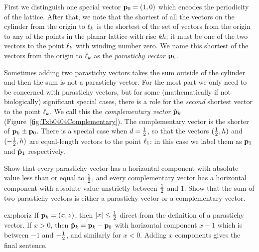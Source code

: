 First we distinguish one special vector ${\mathbf p}_{0}=(1,0)$ which encodes the periodicity of the lattice. After that, we note that the shortest of all the vectors on the cylinder from the origin to $\ell_{{k}}$ is the shortest of the set of vectors from the origin to any of the points in the planar lattice with rise $kh$; it must be one of the two vectors to the point $\ell_{{k}}$ with winding number zero. 
We name this shortest of the vectors from the origin to $\ell_{{k}}$ as  the \textit{parastichy vector} ${\mathbf p}_{k}$.

Sometimes adding two parastichy vectors takes the sum outside of the cylinder and then the sum is not a parastichy vector. For the most part we only need to be concerned with parastichy vectors, but for some (mathematically if not biologically)  significant special cases,  there is a role for the \textit{second} shortest vector to the point $\ell_{{k}}$. We call this the \emph{complementary vector} $\hat{\mathbf p}_{k}$ (Figure~\ref{fig:Txb0404Complementary}). The complementary vector is the shorter of ${\mathbf p}_{k}\pm {\mathbf p}_{0}$. There is a  special case when $d=\textstyle{\frac{1}{2}}$, so that the vectors $(\textstyle{\frac{1}{2}},h)$ and $(-\textstyle{\frac{1}{2}},h)$ are equal-length vectors to the point $\ell_{{1}}$: in this case we label them as ${\mathbf p}_{1}$ and $\hat{\mathbf p}_{1}$ respectively.



\begin{jExercise}\label{ex:phoriz}
	Show that every parastichy vector has a horizontal component with absolute value less than or equal to $\textstyle{\frac{1}{2}}$, and every complementary vector has a horizontal component with absolute value unstrictly between $\textstyle{\frac{1}{2}}$ and $1$. Show that the sum of two parastichy vectors is either a parastichy vector or a complementary vector. 
\end{jExercise}
\begin{jAnswer}{ex:phoriz}
	If ${\mathbf p}_{k}=(x,z)$, then $|x|\leq\textstyle{\frac{1}{2}}$ direct from the definition of a parastichy vector.
	If $x>0$, then $\hat{\mathbf p}_{k}={\mathbf p}_{k}- {\mathbf p}_{0}$ with 
	horizontal component $x-1$ which is between $-1$ and $-\textstyle{\frac{1}{2}}$, and similarly for $x<0$. 
	Adding $x$ components gives the final sentence. 
\end{jAnswer}


